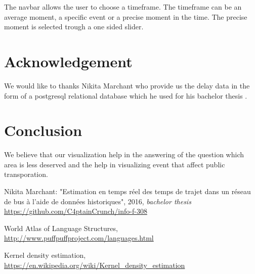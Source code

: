\documentclass[11pt]{article}%
\begin{document}
The navbar allows the user to choose a timeframe. The timeframe can be an average moment, a specific event or a precise moment in the time. The precise moment is selected trough a one sided slider.

\section{Acknowledgement}

We would like to thanks Nikita Marchant who provide us the delay data in the form of a postgresql relational database which he used for his bachelor thesis \cite{nikita}. 

\section{Conclusion}
We believe that our visualization help in the answering of the question which area is less deserved and the help in visualizing event that affect public transporation. 

 
\begin{thebibliography}{9}
 
Nikita Marchant: "Estimation en temps réel des temps de trajet dans un réseau de bus à l'aide de données historiques", 2016, \textit{bachelor thesis}
\\\url{https://github.com/C4ptainCrunch/info-f-308}

World Atlas of Language Structures,
\\\url{http://www.puffpuffproject.com/languages.html}

Kernel density estimation,
\\\url{https://en.wikipedia.org/wiki/Kernel_density_estimation}



\end{thebibliography}
\end{document}

